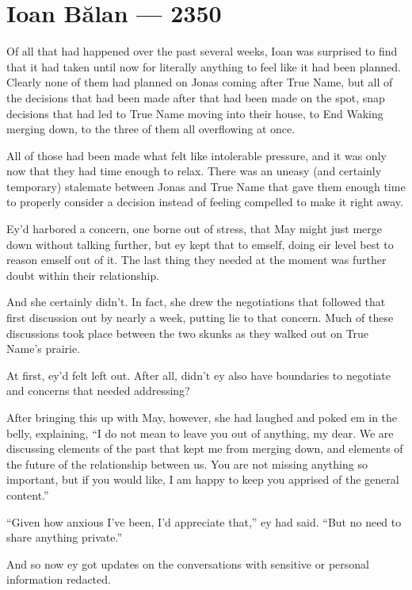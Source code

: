 \hypertarget{ioan-bux103lan-2350}{%
\chapter{Ioan Bălan — 2350}\label{ioan-bux103lan-2350}}

Of all that had happened over the past several weeks, Ioan was surprised to find that it had taken until now for literally anything to feel like it had been planned. Clearly none of them had planned on Jonas coming after True Name, but all of the decisions that had been made after that had been made on the spot, snap decisions that had led to True Name moving into their house, to End Waking merging down, to the three of them all overflowing at once.

All of those had been made what felt like intolerable pressure, and it was only now that they had time enough to relax. There was an uneasy (and certainly temporary) stalemate between Jonas and True Name that gave them enough time to properly consider a decision instead of feeling compelled to make it right away.

Ey'd harbored a concern, one borne out of stress, that May might just merge down without talking further, but ey kept that to emself, doing eir level best to reason emself out of it. The last thing they needed at the moment was further doubt within their relationship.

And she certainly didn't. In fact, she drew the negotiations that followed that first discussion out by nearly a week, putting lie to that concern. Much of these discussions took place between the two skunks as they walked out on True Name's prairie.

At first, ey'd felt left out. After all, didn't ey also have boundaries to negotiate and concerns that needed addressing?

After bringing this up with May, however, she had laughed and poked em in the belly, explaining, ``I do not mean to leave you out of anything, my dear. We are discussing elements of the past that kept me from merging down, and elements of the future of the relationship between us. You are not missing anything so important, but if you would like, I am happy to keep you apprised of the general content.''

``Given how anxious I've been, I'd appreciate that,'' ey had said. ``But no need to share anything private.''

And so now ey got updates on the conversations with sensitive or personal information redacted.

